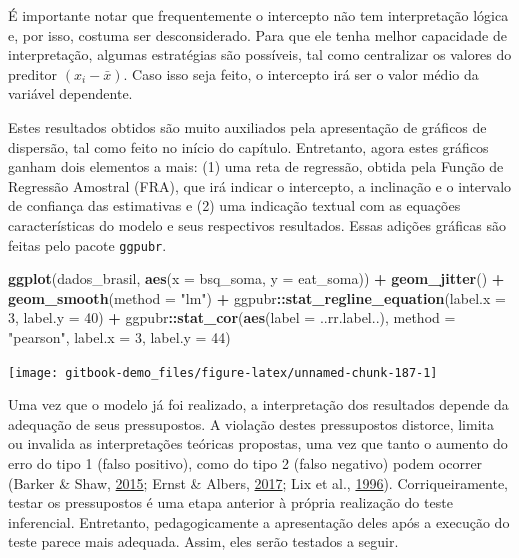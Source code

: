 \documentclass[
]{book}
\newenvironment{Shaded}{\begin{snugshade}}{\end{snugshade}}
\newcommand{\DataTypeTok}[1]{\textcolor[rgb]{0.13,0.29,0.53}{#1}}
\newcommand{\DecValTok}[1]{\textcolor[rgb]{0.00,0.00,0.81}{#1}}
\newcommand{\KeywordTok}[1]{\textcolor[rgb]{0.13,0.29,0.53}{\textbf{#1}}}
\newcommand{\NormalTok}[1]{#1}
\newcommand{\OperatorTok}[1]{\textcolor[rgb]{0.81,0.36,0.00}{\textbf{#1}}}
\newcommand{\StringTok}[1]{\textcolor[rgb]{0.31,0.60,0.02}{#1}}
\begin{document}
É importante notar que frequentemente o intercepto não tem interpretação
lógica e, por isso, costuma ser desconsiderado. Para que ele tenha
melhor capacidade de interpretação, algumas estratégias são possíveis,
tal como centralizar os valores do preditor \((x_i-\bar{x})\). Caso isso
seja feito, o intercepto irá ser o valor médio da variável dependente.

Estes resultados obtidos são muito auxiliados pela apresentação de
gráficos de dispersão, tal como feito no início do capítulo. Entretanto,
agora estes gráficos ganham dois elementos a mais: (1) uma reta de
regressão, obtida pela Função de Regressão Amostral (FRA), que irá
indicar o intercepto, a inclinação e o intervalo de confiança das
estimativas e (2) uma indicação textual com as equações características
do modelo e seus respectivos resultados. Essas adições gráficas são
feitas pelo pacote \texttt{ggpubr}.

\begin{Shaded}
\begin{Highlighting}[]
\KeywordTok{ggplot}\NormalTok{(dados_brasil, }\KeywordTok{aes}\NormalTok{(}\DataTypeTok{x =}\NormalTok{ bsq_soma, }\DataTypeTok{y =}\NormalTok{ eat_soma)) }\OperatorTok{+}
\StringTok{  }\KeywordTok{geom_jitter}\NormalTok{() }\OperatorTok{+}\StringTok{ }\KeywordTok{geom_smooth}\NormalTok{(}\DataTypeTok{method =} \StringTok{"lm"}\NormalTok{) }\OperatorTok{+}\StringTok{ }
\StringTok{  }\NormalTok{ggpubr}\OperatorTok{::}\KeywordTok{stat_regline_equation}\NormalTok{(}\DataTypeTok{label.x =} \DecValTok{3}\NormalTok{, }\DataTypeTok{label.y =} \DecValTok{40}\NormalTok{) }\OperatorTok{+}
\StringTok{  }\NormalTok{ggpubr}\OperatorTok{::}\KeywordTok{stat_cor}\NormalTok{(}\KeywordTok{aes}\NormalTok{(}\DataTypeTok{label =}\NormalTok{  ..rr.label..), }\DataTypeTok{method =} \StringTok{"pearson"}\NormalTok{, }\DataTypeTok{label.x =} \DecValTok{3}\NormalTok{, }\DataTypeTok{label.y =} \DecValTok{44}\NormalTok{)}
\end{Highlighting}
\end{Shaded}

\begin{center}\texttt{[image: gitbook-demo\_files/figure-latex/unnamed-chunk-187-1]} \end{center}

Uma vez que o modelo já foi realizado, a interpretação dos resultados
depende da adequação de seus pressupostos. A violação destes
pressupostos distorce, limita ou invalida as interpretações teóricas
propostas, uma vez que tanto o aumento do erro do tipo 1 (falso
positivo), como do tipo 2 (falso negativo) podem ocorrer (Barker \&
Shaw, \protect\hyperlink{ref-Barker2015}{2015}; Ernst \& Albers,
\protect\hyperlink{ref-Ernst2017}{2017}; Lix et al.,
\protect\hyperlink{ref-Lix1996}{1996}). Corriqueiramente, testar os
pressupostos é uma etapa anterior à própria realização do teste
inferencial. Entretanto, pedagogicamente a apresentação deles após a
execução do teste parece mais adequada. Assim, eles serão testados a
seguir.
\end{document}
